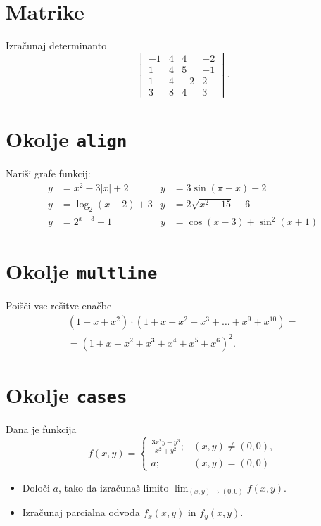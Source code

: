 \documentclass[a4paper,12pt]{article}
\begin{document}
\section*{Matrike}
Izračunaj determinanto
\[\begin{vmatrix}
   -1 & 4 & 4 & -2 \\
   1 & 4 & 5 & -1 \\
   1 & 4 & -2 & 2 \\
   3 & 8 & 4 & 3 
\end{vmatrix}.\]

\section*{Okolje \texttt{align}}
Nariši grafe funkcij:
\begin{align*}
   y &= x^2 - 3|x| + 2   & y &= 3 \sin(\pi+x) - 2 \\
   y &= \log_2(x-2) + 3  & y &= 2 \sqrt{x^2+15} + 6 \\
   y &= 2^{x-3} + 1      & y &= \cos(x-3) + \sin^2(x+1)
\end{align*}

\section*{Okolje \texttt{multline}}
Poišči vse rešitve enačbe
\begin{multline*}
   (1+x+x^2) \cdot (1+x+x^2+x^3+\ldots+x^9+x^{10}) = \\
   =(1+x+x^2+x^3+x^4+x^5+x^6)^2.
\end{multline*}

\section*{Okolje \texttt{cases}}
Dana je funkcija
\[f(x,y) = \begin{cases}
   \frac{3x^2y-y^3}{x^2+y^2}; &(x,y) \ne (0,0), \\
   a; &(x,y) = (0,0)
\end{cases}\]
\begin{itemize}
\item Določi \(a\), tako da izračunaš limito \( \lim_{(x,y)\to(0,0)} f(x,y) \).
\item Izračunaj parcialna odvoda \(f_x(x,y)\) in \(f_y(x,y)\).
\end{itemize}
\end{document}
